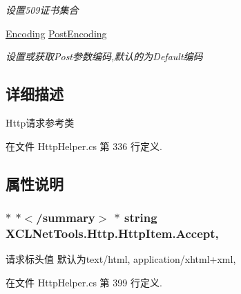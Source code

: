 \begin{DoxyCompactItemize}
\begin{DoxyCompactList}\small\item\em 设置509证书集合 \end{DoxyCompactList}\item 
\hyperlink{class_x_c_l_net_tools_1_1_http_1_1_http_item_aa3c95b011d9366a1de9f897603b71b93}{Encoding} \hyperlink{class_x_c_l_net_tools_1_1_http_1_1_http_item_a75c55be0dc77b94b342b4360e0e4c6fa}{Post\-Encoding}
\begin{DoxyCompactList}\small\item\em 设置或获取\-Post参数编码,默认的为\-Default编码 \end{DoxyCompactList}\end{DoxyCompactItemize}


\subsection{详细描述}
Http请求参考类 



在文件 Http\-Helper.\-cs 第 336 行定义.



\subsection{属性说明}
\hypertarget{class_x_c_l_net_tools_1_1_http_1_1_http_item_add8bdd43831813b22267a47cf46f7768}{
\subsubsection[{Accept}]{\setlength{\rightskip}{0pt plus 5cm}$\ast$ $\ast$$<$/summary$>$ $\ast$ string X\-C\-L\-Net\-Tools.\-Http.\-Http\-Item.\-Accept\hspace{0.3cm}{\ttfamily [get]}, {\ttfamily [set]}}}\label{class_x_c_l_net_tools_1_1_http_1_1_http_item_add8bdd43831813b22267a47cf46f7768}


请求标头值 默认为text/html, application/xhtml+xml, 



在文件 Http\-Helper.\-cs 第 399 行定义.

